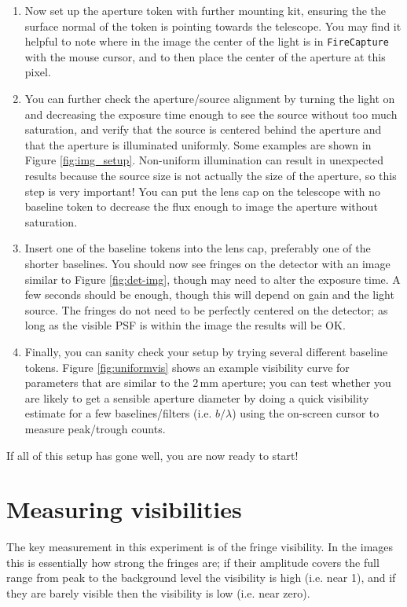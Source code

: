 \documentclass[11pt]{article}
\begin{document}
\begin{enumerate}
    \item Now set up the aperture token with further mounting kit, ensuring the the surface normal of the token is pointing towards the telescope. You may find it helpful to note where in the image the center of the light is in \texttt{FireCapture} with the mouse cursor, and to then place the center of the aperture at this pixel.
    \item You can further check the aperture/source alignment by turning the light on and decreasing the exposure time enough to see the source without too much saturation, and verify that the source is centered behind the aperture and that the aperture is illuminated uniformly. Some examples are shown in Figure \ref{fig:img_setup}. Non-uniform illumination can result in unexpected results because the source size is not actually the size of the aperture, so this step is very important! You can  put the lens cap on the telescope with no baseline token to decrease the flux enough to image the aperture without saturation.
    \item Insert one of the baseline tokens into the lens cap, preferably one of the shorter baselines. You should now see fringes on the detector with an image similar to Figure \ref{fig:det-img}, though may need to alter the exposure time. A few seconds should be enough, though this will depend on gain and the light source. The fringes do not need to be perfectly centered on the detector; as long as the visible PSF is within the image the results will be OK.
    \item Finally, you can sanity check your setup by trying several different baseline tokens. Figure \ref{fig:uniformvis} shows an example visibility curve for parameters that are similar to the 2\,mm aperture; you can test whether you are likely to get a sensible aperture diameter by doing a quick visibility estimate for a few baselines/filters (i.e. $b/\lambda$) using the on-screen cursor to measure peak/trough counts.
\end{enumerate}

If all of this setup has gone well, you are now ready to start!

\clearpage
\section{Measuring visibilities}\label{sec:meas}

The key measurement in this experiment is of the fringe visibility. In the images this is essentially how strong the fringes are; if their amplitude covers the full range from peak to the background level the visibility is high (i.e. near 1), and if they are barely visible then the visibility is low (i.e. near zero).
\end{document}
